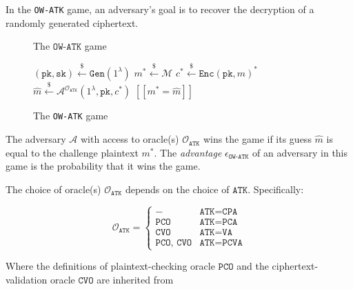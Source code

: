 \documentclass[floatrow,journal=tches,submission]{iacrtrans}
\newcommand{\keygen}{\texttt{Gen}}
\newcommand{\encrypt}{\texttt{Enc}}
\newcommand{\pk}{\texttt{pk}}
\newcommand{\sk}{\texttt{sk}}
\newcommand{\leftsample}{\stackrel{\$}{\leftarrow}}
\newcommand{\llbrack}{[\![}
\newcommand{\rrbrack}{]\!]}
\begin{document}
In the \texttt{OW-ATK} game, an adversary's goal is to recover the decryption of a randomly generated ciphertext.

\begin{figure}
    \centering

    \begin{algorithm}[H]
        \caption{
            The $\texttt{OW-ATK}$ game
        }\label{alg:pke-ow-atk-game}
        \begin{algorithmic}[1]
            \State $(\pk, \sk) \leftsample \keygen(1^\lambda)$
            \State $m^\ast \leftsample \mathcal{M}$
            \State $c^\ast \leftsample \encrypt(\pk, m)^\ast$
            \State $\hat{m} \leftsample \mathcal{A}^{\mathcal{O}_\texttt{ATK}}(1^\lambda, \pk, c^\ast)$
            \State \Return $\llbrack m^\ast = \hat{m} \rrbrack$
        \end{algorithmic}
    \end{algorithm}
    
    \caption{The \texttt{OW-ATK} game}
    \label{fig:pke-ow-atk-game}
\end{figure}

The adversary $\mathcal{A}$ with access to oracle(s) $\mathcal{O}_\texttt{ATK}$ wins the game if its guess $\hat{m}$ is equal to the challenge plaintext $m^\ast$. The \textit{advantage} $\epsilon_\texttt{OW-ATK}$ of an adversary in this game is the probability that it wins the game.

The choice of oracle(s) $\mathcal{O}_\texttt{ATK}$ depends on the choice of $\texttt{ATK}$. Specifically:

\begin{equation*}
    \mathcal{O}_\texttt{ATK} = \begin{cases}
        - & \texttt{ATK} = \texttt{CPA} \\
        \texttt{PCO} & \texttt{ATK} = \texttt{PCA} \\
        \texttt{CVO} & \texttt{ATK} = \texttt{VA} \\
        \texttt{PCO, CVO} & \texttt{ATK} = \texttt{PCVA}
    \end{cases}
\end{equation*}

Where the definitions of plaintext-checking oracle $\texttt{PCO}$ and the ciphertext-validation oracle $\texttt{CVO}$ are inherited from \cite{hofheinz2017modular}
\end{document}
